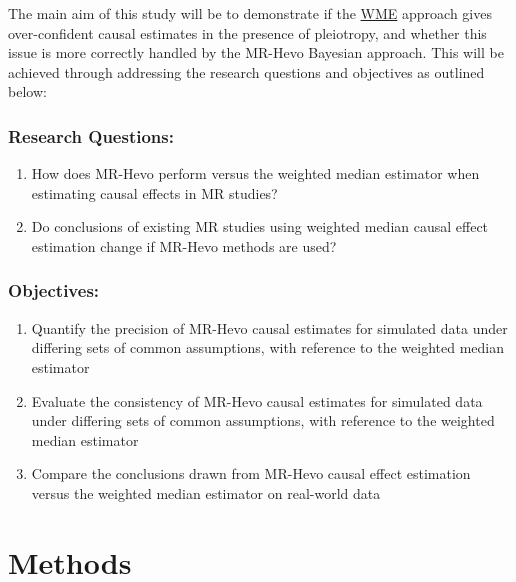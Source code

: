 \documentclass[
]{article}
\providecommand{\tightlist}{%
  \setlength{\itemsep}{0pt}\setlength{\parskip}{0pt}}
\begin{document}
The main aim of this study will be to demonstrate if the \hyperref[acronyms_WME]{WME} approach gives over-confident causal estimates in the presence of pleiotropy, and whether this issue is more correctly handled by the MR-Hevo Bayesian approach. This will be achieved through addressing the research questions and objectives as outlined below:

\subsubsection*{Research Questions:}\label{research-questions}

\begin{enumerate}
\def\labelenumi{\arabic{enumi}.}
\tightlist
\item
  How does MR-Hevo perform versus the weighted median estimator when estimating causal effects in MR studies?
\item
  Do conclusions of existing MR studies using weighted median causal effect estimation change if MR-Hevo methods are used?
\end{enumerate}

\subsubsection*{Objectives:}\label{objectives}

\begin{enumerate}
\def\labelenumi{\arabic{enumi}.}
\tightlist
\item
  Quantify the precision of MR-Hevo causal estimates for simulated data under differing sets of common assumptions, with reference to the weighted median estimator
\item
  Evaluate the consistency of MR-Hevo causal estimates for simulated data under differing sets of common assumptions, with reference to the weighted median estimator
\item
  Compare the conclusions drawn from MR-Hevo causal effect estimation versus the weighted median estimator on real-world data
\end{enumerate}

\newpage

\section{Methods}\label{methods}
\end{document}
